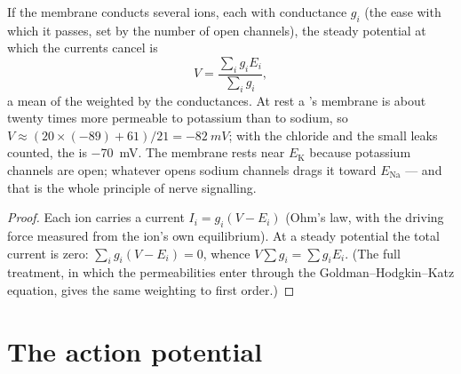 \begin{theorem}\label{thm:b2:neurons-synapses:chord}
If the membrane conducts several ions, each with conductance $g_i$
(the ease with which it passes, set by the number of open channels),
the steady potential at which the currents cancel is
\[
V = \frac{\sum_i g_i E_i}{\sum_i g_i},
\]
a mean of the  weighted by the conductances.
At rest a 's membrane is about twenty times more permeable
to potassium than to sodium, so $V \approx (20\times(-89) +
61)/21 = \qty{-82}{mV}$; with the chloride and the small leaks
counted, the  is \qty{-70}{mV}. The membrane rests
near $E_{\mathrm K}$ because potassium channels are open; whatever
opens sodium channels drags it toward $E_{\mathrm{Na}}$ --- and that
is the whole principle of nerve signalling.
\end{theorem}
\begin{proof}
Each ion carries a current $I_i = g_i(V - E_i)$ (Ohm's law, with
the driving force measured from the ion's own equilibrium). At a
steady potential the total current is zero: $\sum_i g_i(V - E_i) =
0$, whence $V\sum g_i = \sum g_iE_i$. (The full treatment, in which
the permeabilities enter through the Goldman--Hodgkin--Katz
equation, gives the same weighting to first order.)
\end{proof}

\section{The action potential}

